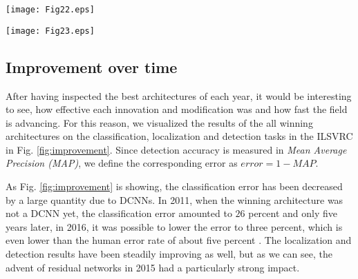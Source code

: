 \documentclass[conference]{IEEEtran}
\begin{document}
\begin{figure*}
\texttt{[image: Fig22.eps]}
\caption{The MobileNet-v1, consisting of a $3 \times 3$ convolutional layer, 13 $3 \times 3$ depthwise separable convolutions, a $7 \times 7$ average pooling layer and a final fully-connected layer before the output layer}
\label{fig:mobilenetv1}
\end{figure*}



\begin{figure*}[h!]
\texttt{[image: Fig23.eps]}
\caption{Results of the best performing architectures on the ILSVRC classification, localization and detection challenges}
\label{fig:improvement}
\end{figure*}

\subsection{Improvement over time}
After having inspected the best architectures of each year, it would be interesting to see, how effective each innovation and modification was and how fast the field is advancing. For this reason, we visualized the results of the all winning architectures on the classification, localization and detection tasks in the ILSVRC in Fig. \ref{fig:improvement}. Since detection accuracy is measured in \emph{Mean Average Precision (MAP)}, we define the corresponding error as $error = 1-MAP$.

As Fig. \ref{fig:improvement} is showing, the classification error has been decreased by a large quantity due to DCNNs. In 2011, when the winning architecture was not a DCNN yet, the classification error amounted to $26$ percent and only five years later, in 2016, it was possible to lower the error to three percent, which is even lower than the human error rate of about five percent \cite{ILSVRC}. The localization and detection results have been steadily improving as well, but as we can see, the advent of residual networks in 2015 had a particularly strong impact.
\end{document}
